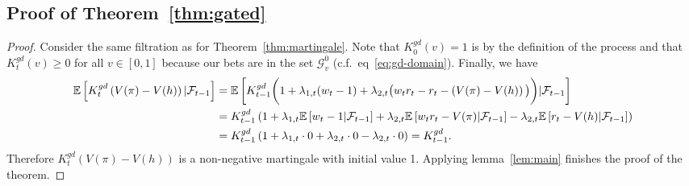 \subsection{Proof of Theorem~\ref{thm:gated}}
\begin{proof}

Consider the same filtration as for Theorem~\ref{thm:martingale}.
Note that $K_0^{gd}(v)=1$ is by 
the definition of the process and that $K_t^{gd}(v)\geq 0$ for all 
$v \in [0,1]$ because our bets 
are in the set $\mathcal{G}_v^0$ (c.f.\ eq~\eqref{eq:gd-domain}).
Finally, we have
\begin{align*}
    \mathbb{E}\left[K_t^{gd}\left(V(\pi)-V(h)\right)|\mathcal{F}_{t-1}\right]
    &= \mathbb{E}\left[K_{t-1}^{gd}\bigg(1+\lambda_{1,t}(w_t-1)+\lambda_{2,t}
    \big(w_t r_t - r_t - \left(V(\pi)-V(h)\right)\big)\bigg)|\mathcal{F}_{t-1}\right]\\
    &= K_{t-1}^{gd}\left(1+\lambda_{1,t} \mathbb{E}\left[w_t-1|\mathcal{F}_{t-1}\right]
    +\lambda_{2,t}\mathbb{E}\left[w_t r_t - V(\pi)|\mathcal{F}_{t-1}\right]
    -\lambda_{2,t}\mathbb{E}\left[r_t - V(h)|\mathcal{F}_{t-1}\right]\right)\\
    &= K_{t-1}^{gd}\left(1+\lambda_{1,t} \cdot 0 + \lambda_{2,t} \cdot 0 - \lambda_{2,t} \cdot 0\right) = K_{t-1}^{gd}.
\end{align*}
Therefore $K_t^{gd}(V(\pi)-V(h))$ is a non-negative martingale with initial
value 1. Applying 
lemma~\ref{lem:main} finishes the proof of the theorem.
\end{proof}

